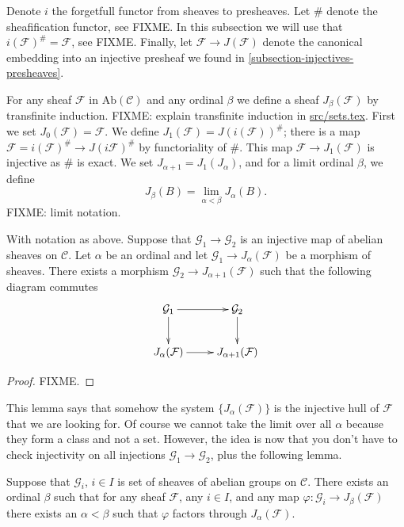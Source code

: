 \smallskip\noindent
Denote $i$ the forgetfull functor from sheaves to presheaves. Let
$\#$ denote the sheafification functor, see FIXME. In this subsection we
will use that $i(\mathcal{F})^\# = \mathcal{F}$, see FIXME.
Finally, let $\mathcal{F} \to J(\mathcal{F})$ denote the canonical
embedding into an injective presheaf we found in 
\autoref{subsection-injectives-presheaves}. 

\smallskip\noindent
For any sheaf $\mathcal{F}$ in $\text{Ab}(\mathcal{C})$ and
any ordinal $\beta$ we define a sheaf
$J_\beta(\mathcal{F})$ by transfinite induction.
FIXME: explain transfinite induction in \url{src/sets.tex}.
First we set $J_0(\mathcal{F})=\mathcal{F}$.
We define $J_1(\mathcal{F})=J(i(\mathcal{F}))^\#$;
there is a map $\mathcal{F}=i(\mathcal{F})^\# \to J(i\mathcal{F})^\#$
by functoriality of $\#$. This map $\mathcal{F} \to J_1(\mathcal{F})$
is injective as $\#$ is exact. We set $J_{\alpha+1}=J_1(J_\alpha)$, 
and for a limit ordinal $\beta$, we define
$$
J_\beta(B) = \lim_{\alpha < \beta} J_\alpha(B).
$$
FIXME: limit notation.

\begin{lemma}
\label{lemma-map-into-next-one}
With notation as above.
Suppose that $\mathcal{G}_1 \to \mathcal{G}_2$ is an injective
map of abelian sheaves on $\mathcal{C}$. Let $\alpha$ be an ordinal
and let $\mathcal{G}_1\to J_\alpha(\mathcal{F})$ be a morphism
of sheaves. There exists a morphism $\mathcal{G}_2 \to
J_{\alpha+1}(\mathcal{F})$ such that the following diagram commutes
$$
\xymatrix{
\mathcal{G}_1 \ar[d] \ar[r] & \mathcal{G}_2 \ar[d] \\
J_{\alpha}(\mathcal{F}) \ar[r] & J_{\alpha+1}(\mathcal{F}) }
$$
\end{lemma}

\begin{proof}
FIXME.
\end{proof}

\noindent
This lemma says that somehow the system $\{J_{\alpha}(\mathcal{F})\}$
is the injective hull of $\mathcal{F}$ that we are looking for. Of course
we cannot take the limit over all $\alpha$ because they form a class
and not a set. However, the idea is now that you don't have to check
injectivity on all injections $\mathcal{G}_1 \to \mathcal{G}_2$, plus
the following lemma.

\begin{lemma}
\label{lemma-map-into-smaller}
Suppose that $\mathcal{G}_i$, $i\in I$ is set of sheaves of abelian 
groups on $\mathcal{C}$. There exists an ordinal $\beta$ such that
for any sheaf $\mathcal{F}$, any $i\in I$, and any map $\varphi : 
\mathcal{G}_i \to J_\beta(\mathcal{F})$ there exists an 
$\alpha < \beta$ such that $ \varphi $ factors through 
$J_\alpha(\mathcal{F})$.
\end{lemma}


